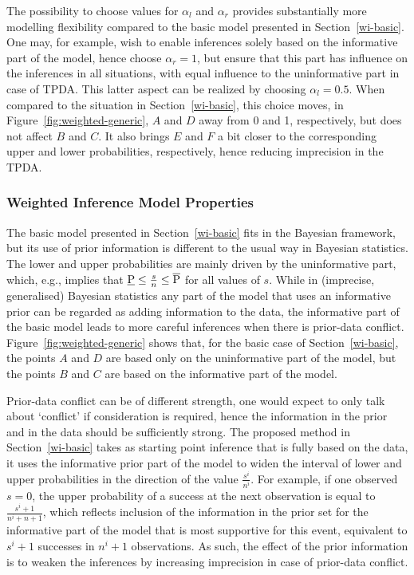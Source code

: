 The possibility to choose values for $\alpha_l$ and $\alpha_r$
provides substantially more modelling flexibility compared to the
basic model presented in Section~\ref{wi-basic}. One may, for
example, wish to enable inferences solely based on the informative
part of the model, hence choose $\alpha_r=1$, but ensure that this
part has influence on the inferences in all situations, with equal
influence to the uninformative part in case of TPDA. This latter
aspect can be realized by choosing $\alpha_l=0.5$. When compared to
the situation in Section~\ref{wi-basic}, this choice moves, in
Figure~\ref{fig:weighted-generic}, $A$ and $D$ away
from 0 and 1, respectively, but does not affect $B$ and $C$. It also
brings $E$ and $F$ a bit closer to the corresponding upper and lower
probabilities, respectively, hence reducing imprecision in the TPDA.


\subsubsection{Weighted Inference Model Properties}
\label{wi-prop}

The basic model presented in Section~\ref{wi-basic} fits in the Bayesian framework, but
its use of prior information is different to the usual way in Bayesian
statistics. The lower and upper probabilities are mainly driven by the uninformative part, which, e.g.,
implies that $\underline{\operatorname{P}} \leq \frac{s}{n} \leq \overline{\operatorname{P}}$ for all values
of $s$. While in (imprecise, generalised) Bayesian statistics any
part of the model that uses an informative prior can be
regarded as adding information to the data, the informative part of the basic model
leads to more careful inferences when there is prior-data conflict.
Figure~\ref{fig:weighted-generic} shows that, for the basic case of
Section~\ref{wi-basic}, the points $A$ and $D$ are based
only on the uninformative part of the model, but the points $B$ and $C$ are based on the
informative part of the model.

Prior-data conflict can be of different strength, one would expect
to only talk about `conflict' if consideration is required, hence the information in the prior
and in the data should be sufficiently strong. The proposed method
in Section~\ref{wi-basic} takes as starting point inference that is
fully based on the data, it uses the informative prior part of
the model to widen the interval of lower and upper
probabilities in the direction of the value $\frac{s^i}{n^i}$. For
example, if one observed $s=0$, the upper probability of a success
at the next observation is equal to $\frac{s^i+1}{n^i+n+1}$, which
reflects inclusion of the information in the prior set for the
informative part of the model that is most supportive for this
event, equivalent to $s^i+1$ successes in $n^i+1$
observations. As such, the effect of the prior information is to weaken
the inferences by increasing imprecision in case of prior-data conflict.

